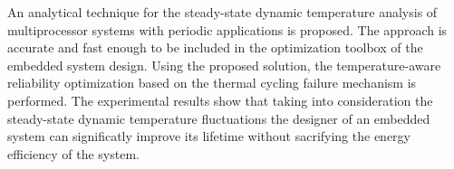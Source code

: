 An analytical technique for the steady-state dynamic temperature analysis of multiprocessor systems with periodic applications is proposed. The approach is accurate and fast enough to be included in the optimization toolbox of the embedded system design. Using the proposed solution, the temperature-aware reliability optimization based on the thermal cycling failure mechanism is performed. The experimental results show that taking into consideration the steady-state dynamic temperature fluctuations the designer of an embedded system can significatly improve its lifetime without sacrifying the energy efficiency of the system.
